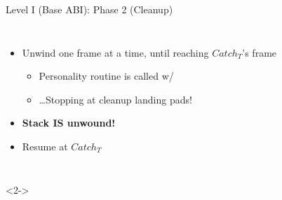 \begin{frame}{Level I (Base ABI): Phase 2 (Cleanup)}
  \begin{columns}
    \begin{itemize}
    \item Unwind one frame at a time, until reaching $Catch_{T}$'s frame
      \begin{itemize}
      \item Personality routine is called w/ 
      \item \ldots{}Stopping at cleanup landing pads!
      \end{itemize}
      \bigskip

    \item \textbf{Stack IS unwound!}

    \item Resume at $Catch_{T}$
    \end{itemize}

    \begin{center}
      \resizebox{0.9\columnwidth}{!}{}
    \end{center}
  \end{columns}

  \begin{onlyenv}<2->
  \end{onlyenv}
\end{frame}

